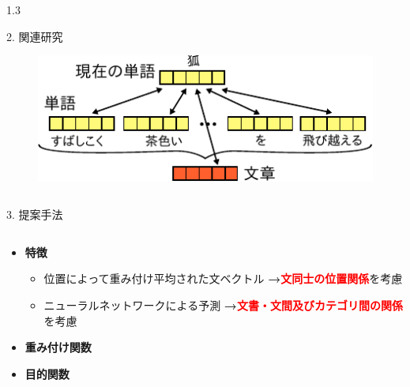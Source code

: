 \documentclass[unicode,10pt]{beamer}
\newlength{\mycolumnwidth}
\newcommand{\arrow}{\textcolor{ttiblue}{\textbf{→}}\hspace{1ex}}
\newcommand{\itemtitle}[1]{\textbf{#1}\\}
\newcommand{\fire}[1]{\textcolor{red}{\textbf{#1}}}
\begin{document}
\begin{frame}
\begin{columns}[onlytextwidth,t]
\begin{column}{1.3\mycolumnwidth}
\begin{block}{2. 関連研究}
{\begin{figure}
          \includegraphics[width=\linewidth]{fig/paragraph_vector.pdf}
        \end{figure}
      }
    \end{block}
  \end{column}
\end{columns}

\begin{block}{3. 提案手法}
  \begin{columns}[onlytextwidth,t]
    \begin{column}{\mycolumnwidth}
      \begin{itemize}
        \item \itemtitle{特徴}
          \begin{itemize}
            \item 位置によって重み付け平均された文ベクトル
                  \arrow \fire{文同士の位置関係}を考慮
            \item ニューラルネットワークによる予測
                  \arrow \fire{文書・文間及びカテゴリ間の関係}を考慮
          \end{itemize}
        \item \itemtitle{重み付け関数}
        \item \itemtitle{目的関数}
      \end{itemize}

\end{column}
\end{columns}
\end{block}
\end{frame}
\end{document}
